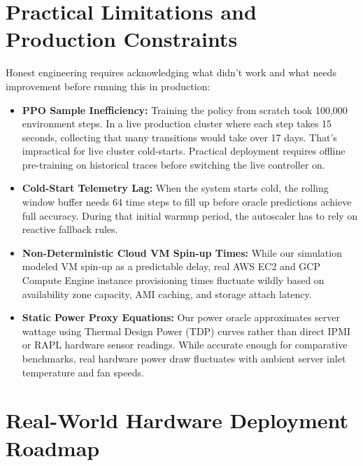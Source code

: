 \documentclass[12pt]{report}
\begin{document}
\section{Practical Limitations and Production Constraints}

Honest engineering requires acknowledging what didn't work and what needs improvement before running this in production:

\begin{itemize}
\item \textbf{PPO Sample Inefficiency:} Training the policy from scratch took 100,000 environment steps. In a live production cluster where each step takes 15 seconds, collecting that many transitions would take over 17 days. That's impractical for live cluster cold-starts. Practical deployment requires offline pre-training on historical traces before switching the live controller on.
\item \textbf{Cold-Start Telemetry Lag:} When the system starts cold, the rolling window buffer needs 64 time steps to fill up before oracle predictions achieve full accuracy. During that initial warmup period, the autoscaler has to rely on reactive fallback rules.
\item \textbf{Non-Deterministic Cloud VM Spin-up Times:} While our simulation modeled VM spin-up as a predictable delay, real AWS EC2 and GCP Compute Engine instance provisioning times fluctuate wildly based on availability zone capacity, AMI caching, and storage attach latency.
\item \textbf{Static Power Proxy Equations:} Our power oracle approximates server wattage using Thermal Design Power (TDP) curves rather than direct IPMI or RAPL hardware sensor readings. While accurate enough for comparative benchmarks, real hardware power draw fluctuates with ambient server inlet temperature and fan speeds.
\end{itemize}

\section{Real-World Hardware Deployment Roadmap}
\end{document}
